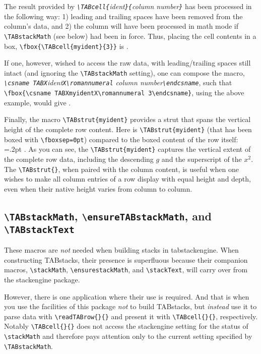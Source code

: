 \documentclass{article}
\begin{document}
{\fboxsep=1pt%
The result provided by {\itshape\verb|\TABcell{|ident\verb|}{|column number\verb|}|} has
been processed in the following way: 1) leading and trailing spaces have been removed
from the column's data, and 2) the column will have been processed in math mode if
\verb|\TABstackMath| (see below) had been in force.  Thus, placing the cell contents in
a box, \verb|\fbox{\TABcell{myident}{3}}|
is .

If one, however, wished to access the raw
data, with leading/trailing spaces still intact (and ignoring the \verb|\TABstackMath| setting),
one can compose the macro, 
{\itshape\verb|\csname TABX|ident\verb|X\romannumeral| column number\verb|\endcsname|},
such that \verb|\fbox{\csname TABXmyidentX\romannumeral 3\endcsname}|, using the above example,
would give .%
}

Finally, the macro \verb|\TABstrut{myident}| provides a strut that spans the vertical height of the
complete row content.
Here is \verb|\TABstrut{myident}| (that has been boxed with \verb|\fboxsep=0pt|) 
compared to the boxed content of the row itself:\\
{\TABstackMath\fboxsep=0pt\fboxrule=.2pt
}.  As you can see, the \verb|\TABstrut{myident}|
captures the vertical extent of the complete row data, including the descending $g$ and 
the superscript of the $x^2$.  The \verb|\TABstrut{}|, when paired with the column content, 
is useful when one wishes to make all column entries of a row display with equal height and depth, 
even when their native height varies from column to column.
\TABstackText

\subsection*{\texttt{\textbackslash TABstackMath},  \texttt{\textbackslash ensureTABstackMath}, and 
\texttt{\textbackslash TABstackText}}

These macros are \textit{not} needed when building stacks in \textsf{tabstackengine}.
When constructing TABstacks, their presence is superfluous 
because their companion macros, \verb|\stackMath|, \verb|\ensurestackMath|, 
and \verb|\stackText|, will
carry over from the \textsf{stackengine} package.

However, there is one application where their use is required.  And that is when you
use the facilities of this package \textit{not} to build TABstacks, but \textit{instead} use it to parse
data with \verb|\readTABrow{}{}| and present it with \verb|\TABcell{}{}|, respectively.
Notably \verb|\TABcell{}{}| does not access the \textsf{stackengine} setting for 
the status of \verb|\stackMath| and therefore pays attention only to the current setting
specified by \verb|\TABstackMath|.
\end{document}

